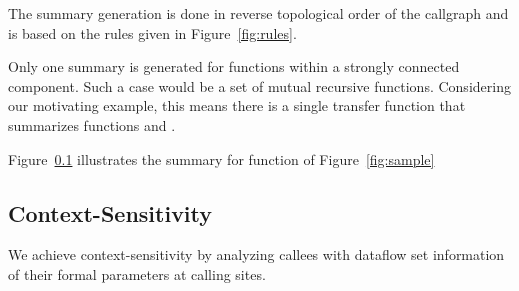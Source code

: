 The summary
generation is done in reverse topological order of
the callgraph and is based on the rules given in
Figure~\ref{fig:rules}.

Only one summary is generated for functions within
a strongly connected component. Such a case would be
a set of mutual recursive functions. Considering our
motivating example, this means there is a single transfer
function that summarizes functions \even{} and \odd{}.

Figure~\ref{} illustrates the summary for function
\main{} of Figure~\ref{fig:sample}

\subsection{Context-Sensitivity} 

We achieve context-sensitivity by analyzing callees
with dataflow set information of their formal parameters
at calling sites.
